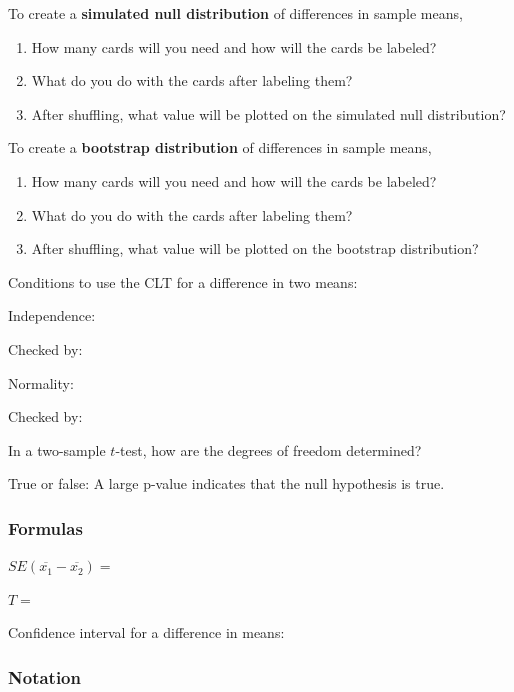 \documentclass[
]{report}
\newcommand{\rgs}{\vspace{12pt}} %
\newcommand{\rgi}{\hspace{24pt}}  %
\begin{document}
To create a \textbf{simulated null distribution} of differences in sample means,

\begin{enumerate}
\def\labelenumi{\arabic{enumi}.}
\item
  How many cards will you need and how will the cards be labeled?
  \rgs
\item
  What do you do with the cards after labeling them?
  \rgs
\item
  After shuffling, what value will be plotted on the simulated null distribution?
  \rgs
\end{enumerate}

To create a \textbf{bootstrap distribution} of differences in sample means,

\begin{enumerate}
\def\labelenumi{\arabic{enumi}.}
\item
  How many cards will you need and how will the cards be labeled?
  \rgs
\item
  What do you do with the cards after labeling them?
  \rgs
\item
  After shuffling, what value will be plotted on the bootstrap distribution?
  \rgs
\end{enumerate}

Conditions to use the CLT for a difference in two means:

\rgi Independence:
\rgs

\rgi \rgi Checked by:
\rgs

\rgi Normality:
\rgs

\rgi \rgi Checked by:
\rgs

In a two-sample \(t\)-test, how are the degrees of freedom determined?
\rgs        

True or false: A large p-value indicates that the null hypothesis is true.
\rgs

\hypertarget{formulas-7}{%
\subsubsection*{Formulas}\label{formulas-7}}

\(SE(\overline{x_1} - \overline{x_2})=\)
\rgs

\(T=\)
\rgs

Confidence interval for a difference in means:
\rgs

\hypertarget{notation-4}{%
\subsubsection*{Notation}\label{notation-4}}
\end{document}
